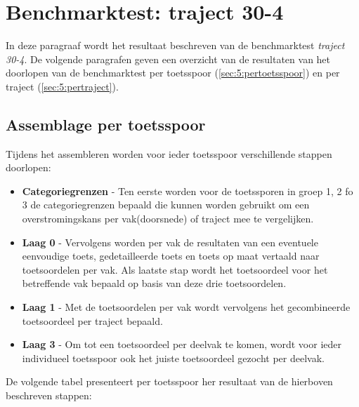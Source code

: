 \section{Benchmarktest: traject 30-4}
	\label{ch:benchmarktTest5}
In deze paragraaf wordt het resultaat beschreven van de benchmarktest \textit{traject 30-4}. De volgende paragrafen geven een overzicht van de resultaten van het doorlopen van de benchmarktest per toetsspoor (\autoref{sec:5:pertoetsspoor}) en per traject (\autoref{sec:5:pertraject}).

\subsection{Assemblage per toetsspoor}
	\label{sec:5:pertoetsspoor}
Tijdens het assembleren worden voor ieder toetsspoor verschillende stappen doorlopen:
\begin{itemize}
	\item \textbf{Categoriegrenzen} - Ten eerste worden voor de toetssporen in groep 1, 2 fo 3 de categoriegrenzen bepaald die kunnen worden gebruikt om een overstromingskans per vak(doorsnede) of traject mee te vergelijken.
	\item \textbf{Laag 0} - Vervolgens worden per vak de resultaten van een eventuele eenvoudige toets, gedetailleerde toets en toets op maat vertaald naar toetsoordelen per vak. Als laatste stap wordt het toetsoordeel voor het betreffende vak bepaald op basis van deze drie toetsoordelen.
	\item \textbf{Laag 1} - Met de toetsoordelen per vak wordt vervolgens het gecombineerde toetsoordeel per traject bepaald.
	\item \textbf{Laag 3} - Om tot een toetsoordeel per deelvak te komen, wordt voor ieder individueel toetsspoor ook het juiste toetsoordeel gezocht per deelvak.
\end{itemize}

De volgende tabel presenteert per toetsspoor her resultaat van de hierboven beschreven stappen:

